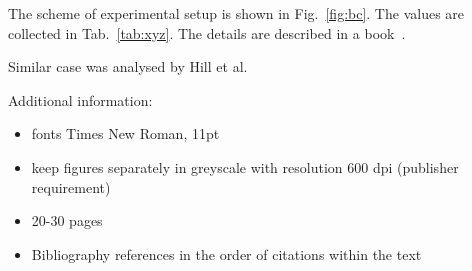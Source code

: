 \documentclass[b5paper, 11pt, openany, titlepage]{book}
\begin{document}
The scheme of experimental setup is shown in Fig.~\ref{fig:bc}.  
The values are collected in Tab.~\ref{tab:xyz}.
The details are described in a book~\cite{udd2011fiber}. 

Similar case was analysed by Hill et al.~\cite{hill1978photosensitivity}

Additional information:
\begin{itemize}
\item fonts Times New Roman, 11pt
\item keep figures separately in greyscale with resolution 600 dpi (publisher requirement)
\item 20-30 pages
\item Bibliography references in the order of citations within the text
\end{itemize}


 
 


\end{document}
